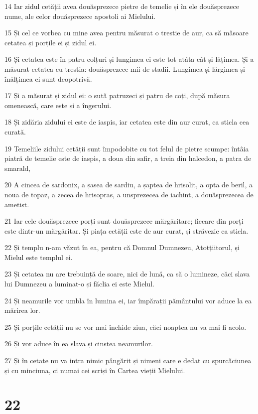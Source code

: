 \par 14 Iar zidul cetății avea douăsprezece pietre de temelie și în ele douăsprezece nume, ale celor douăsprezece apostoli ai Mielului.
\par 15 Și cel ce vorbea cu mine avea pentru măsurat o trestie de aur, ca să măsoare cetatea și porțile ei și zidul ei.
\par 16 Și cetatea este în patru colțuri și lungimea ei este tot atâta cât și lățimea. Și a măsurat cetatea cu trestia: douăsprezece mii de stadii. Lungimea și lărgimea și înălțimea ei sunt deopotrivă.
\par 17 Și a măsurat și zidul ei: o sută patruzeci și patru de coți, după măsura omenească, care este și a îngerului.
\par 18 Și zidăria zidului ei este de iaspis, iar cetatea este din aur curat, ca sticla cea curată.
\par 19 Temeliile zidului cetății sunt împodobite cu tot felul de pietre scumpe: întâia piatră de temelie este de iaspis, a doua din safir, a treia din halcedon, a patra de smarald,
\par 20 A cincea de sardonix, a șasea de sardiu, a șaptea de hrisolit, a opta de beril, a noua de topaz, a zecea de hrisopras, a unsprezecea de iachint, a douăsprezecea de ametist.
\par 21 Iar cele douăsprezece porți sunt douăsprezece mărgăritare; fiecare din porți este dintr-un mărgăritar. Și piața cetății este de aur curat, și străvezie ca sticla.
\par 22 Și templu n-am văzut în ea, pentru că Domnul Dumnezeu, Atotțiitorul, și Mielul este templul ei.
\par 23 Și cetatea nu are trebuință de soare, nici de lună, ca să o lumineze, căci slava lui Dumnezeu a luminat-o și făclia ei este Mielul.
\par 24 Și neamurile vor umbla în lumina ei, iar împărații pământului vor aduce la ea mărirea lor.
\par 25 Și porțile cetății nu se vor mai închide ziua, căci noaptea nu va mai fi acolo.
\par 26 Și vor aduce în ea slava și cinstea neamurilor.
\par 27 Și în cetate nu va intra nimic pângărit și nimeni care e dedat cu spurcăciunea și cu minciuna, ci numai cei scriși în Cartea vieții Mielului.

\chapter{22}

